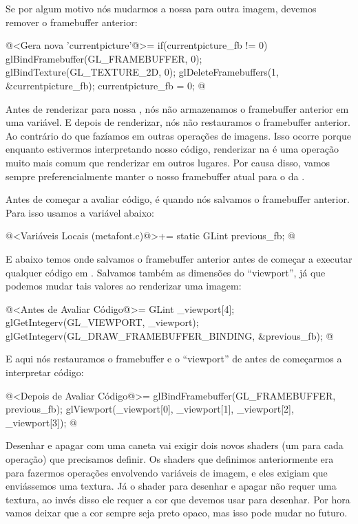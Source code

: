 {{{{{{Se por algum motivo nós mudarmos a nossa 
para outra imagem, devemos remover o framebuffer anterior:

\iniciocodigo
@<Gera nova 'currentpicture'@>=
{
  if(currentpicture_fb != 0){
    glBindFramebuffer(GL_FRAMEBUFFER, 0);
    glBindTexture(GL_TEXTURE_2D, 0);
    glDeleteFramebuffers(1, &currentpicture_fb);
  }
  currentpicture_fb = 0;
}
@
\fimcodigo

Antes de renderizar para nossa , nós não
armazenamos o framebuffer anterior em uma variável. E depois de
renderizar, nós não restauramos o framebuffer anterior. Ao contrário
do que fazíamos em outras operações de imagens. Isso ocorre porque
enquanto estivermos interpretando nosso código, renderizar
na  é uma operação muito mais comum que
renderizar em outros lugares. Por causa disso, vamos sempre
preferencialmente manter o nosso framebuffer atual para o
da .

Antes de começar a avaliar código, é quando nós salvamos o framebuffer
anterior. Para isso usamos a variável abaixo:

\iniciocodigo
@<Variáveis Locais (metafont.c)@>+=
static GLint previous_fb;
@
\fimcodigo

E abaixo temos onde salvamos o framebuffer anterior antes de começar a
executar qualquer código
em . Salvamos também as
dimensões do ``viewport'', já que podemos mudar tais valores ao
renderizar uma imagem:

\iniciocodigo
@<Antes de Avaliar Código@>=
GLint _viewport[4];
glGetIntegerv(GL_VIEWPORT, _viewport);
glGetIntegerv(GL_DRAW_FRAMEBUFFER_BINDING, &previous_fb);
@
\fimcodigo

E aqui nós restauramos o framebuffer e o ``viewport'' de antes de
começarmos a interpretar código:

\iniciocodigo
@<Depois de Avaliar Código@>=
glBindFramebuffer(GL_FRAMEBUFFER, previous_fb);
glViewport(_viewport[0], _viewport[1], _viewport[2], _viewport[3]);
@
\fimcodigo


Desenhar e apagar com uma caneta vai exigir dois novos shaders (um
para cada operação) que precisamos definir. Os shaders que definimos
anteriormente era para fazermos operações envolvendo variáveis de
imagem, e eles exigiam que enviássemos uma textura. Já o shader para
desenhar e apagar não requer uma textura, ao invés disso ele requer a
cor que devemos usar para desenhar. Por hora vamos deixar que a cor
sempre seja preto opaco, mas isso pode mudar no futuro.

}}}}}}
